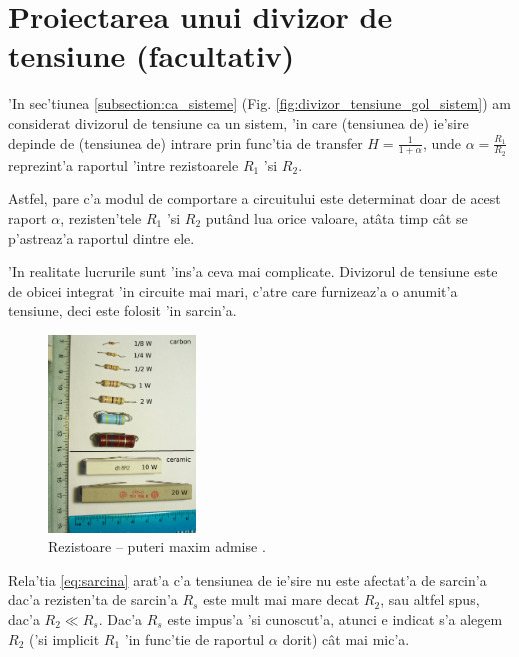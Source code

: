 \section[Proiectarea unui divizor de tensiune]{Proiectarea unui divizor de tensiune (facultativ)}

'In sec'tiunea \ref{subsection:ca_sisteme} (Fig. \ref{fig:divizor_tensiune_gol_sistem}) am considerat divizorul de tensiune ca un sistem, 'in care (tensiunea de) ie'sire depinde de (tensiunea de) intrare prin func'tia de transfer $H = \frac{1}{1+\alpha}$, unde $\alpha = \frac{R_1}{R_2}$ reprezint'a raportul 'intre rezistoarele ${R_1}$ 'si $R_2$. 

Astfel, pare c'a modul de comportare a circuitului este determinat doar de acest raport $\alpha$, rezisten'tele ${R_1}$ 'si $R_2$ put\^and lua orice valoare, at\^ata timp c\^at se p'astreaz'a raportul dintre ele. 

'In realitate lucrurile sunt 'ins'a ceva mai complicate. Divizorul de tensiune este de obicei integrat 'in circuite mai mari, c'atre care furnizeaz'a o anumit'a tensiune, deci este folosit 'in sarcin'a. %

\begin{figure}[!b]
	\centering
		\includegraphics[width=0.35\textwidth]{laborator_01/figuri/7_resistors_power_ratings}
	\caption{Rezistoare -- puteri maxim admise \cite{rezistoare_puteri}.}
	\label{fig:rezistoare_puteri}
\end{figure}

Rela'tia \ref{eq:sarcina} arat'a c'a tensiunea de ie'sire nu este afectat'a de sarcin'a dac'a rezisten'ta de sarcin'a $R_s$ este mult mai mare decat $R_2$, sau altfel spus, dac'a $R_2 \ll R_s$. Dac'a $R_s$ este impus'a 'si cunoscut'a, atunci e indicat s'a alegem $R_2$ ('si implicit $R_1$ 'in func'tie de raportul $\alpha$ dorit) c\^at mai mic'a. 

